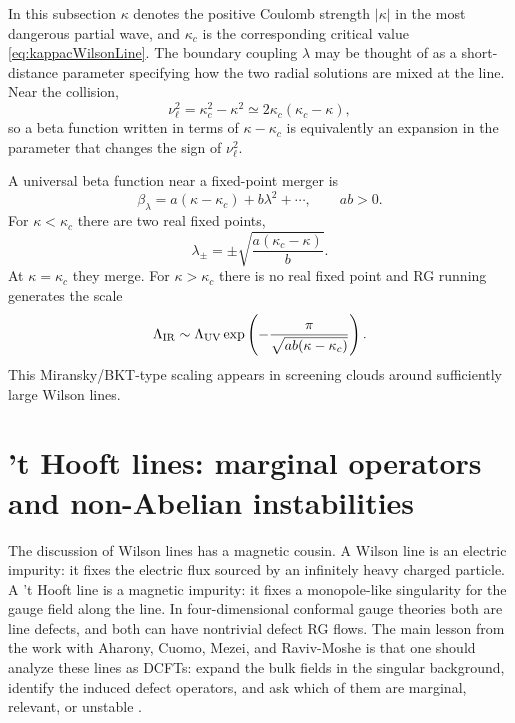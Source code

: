 \documentclass[11pt]{article}
\begin{document}
In this subsection $\kappa$ denotes the positive Coulomb strength $|\kappa|$ in the most dangerous partial wave, and $\kappa_c$ is the corresponding critical value \eqref{eq:kappacWilsonLine}.  The boundary coupling $\lambda$ may be thought of as a short-distance parameter specifying how the two radial solutions are mixed at the line.  Near the collision,
\begin{equation}
  \nu_\ell^2=\kappa_c^2-\kappa^2
  \simeq 2\kappa_c(\kappa_c-\kappa),
\end{equation}
so a beta function written in terms of $\kappa-\kappa_c$ is equivalently an expansion in the parameter that changes the sign of $\nu_\ell^2$.

A universal beta function near a fixed-point merger is
\begin{equation}
  \beta_\lambda=a(\kappa-\kappa_c)+b\lambda^2+\cdots,
  \qquad a b>0 .
\end{equation}
For $\kappa<\kappa_c$ there are two real fixed points,
\begin{equation}
  \lambda_\pm=\pm\sqrt{\frac{a(\kappa_c-\kappa)}{b}} .
\end{equation}
At $\kappa=\kappa_c$ they merge.  For $\kappa>\kappa_c$ there is no real fixed point and RG running generates the scale
\begin{equation}
  \Lambda_{\rm IR}\sim \Lambda_{\rm UV}\exp\left(-\frac{\pi}{\sqrt{ab(\kappa-\kappa_c)}}\right) .
\end{equation}
This Miransky/BKT-type scaling appears in screening clouds around sufficiently large Wilson lines.


\section{'t Hooft lines: marginal operators and non-Abelian instabilities}

The discussion of Wilson lines has a magnetic cousin.  A Wilson line is an electric impurity: it fixes the electric flux sourced by an infinitely heavy charged particle.  A 't Hooft line is a magnetic impurity: it fixes a monopole-like singularity for the gauge field along the line.  In four-dimensional conformal gauge theories both are line defects, and both can have nontrivial defect RG flows.  The main lesson from the work with Aharony, Cuomo, Mezei, and Raviv-Moshe is that one should analyze these lines as DCFTs: expand the bulk fields in the singular background, identify the induced defect operators, and ask which of them are marginal, relevant, or unstable \cite{AharonyWilsonLines,AharonyWilsonLinesLong}.
\end{document}
